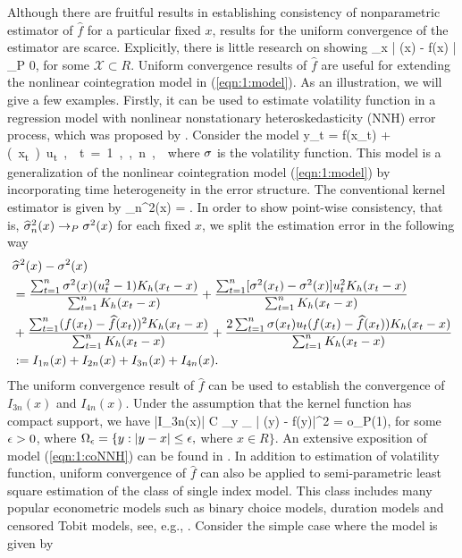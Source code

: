 Although there are fruitful results in establishing consistency of nonparametric estimator of $\widehat{f}$ for a particular fixed $x$, results for the uniform convergence of the estimator are scarce. Explicitly, there is little research on showing
\bestar
\sup_{x \in {}} | (x) - f(x) | \to_P 0,
\eestar
for some $\mathcal{X} \subset R$. Uniform convergence results of $\widehat{f}$ are useful for extending the nonlinear cointegration model in (\ref{eqn:1:model}). As an illustration, we will give a few examples. Firstly, it can be used to estimate volatility function in a regression model with nonlinear nonstationary heteroskedasticity (NNH) error process, which was proposed  by \cite{park2002}. Consider the model
\be {}
y_t = f(x_t) + \si(x_t) u_t, \quad t = 1, ..., n,
\ee
where $\sigma$ is the volatility function. This model is a generalization of the nonlinear cointegration model (\ref{eqn:1:model}) by incorporating time heterogeneity in the error structure. The conventional kernel estimator is given by
\bestar
\widehat{\si}_n^2(x) = .
\eestar
In order to show point-wise consistency, that is, $\widehat{\sigma}^2_n(x) \to_P \sigma^2(x)$ for each fixed $x$, we split the estimation error in the following way
\begin{align}
&\widehat{\sigma}^2(x) - \sigma^2(x) \nonumber\\
&=\frac{\sum_{t = 1}^n \sigma^2(x) (u_t^2 - 1) K_h(x_t - x)}{\sum_{t = 1}^n K_h(x_t - x)} + \frac{\sum_{t = 1}^n [\sigma^2(x_t) - \sigma^2(x) ] u_t^2 K_h(x_t - x)}{\sum_{t = 1}^n K_h(x_t - x)} \nonumber\\
&+\frac{\sum_{t = 1}^n (f(x_t) - \widehat{f}(x_t))^2 K_h(x_t - x)}{\sum_{t = 1}^n K_h(x_t - x)} + \frac{2\sum_{t = 1}^n \sigma(x_t) u_t (f(x_t) - \widehat{f}(x_t))  K_h(x_t - x)}{\sum_{t = 1}^n K_h(x_t - x)} \nonumber\\
&:= I_{1n}(x) + I_{2n}(x) + I_{3n}(x) + I_{4n}(x). \nonumber
\end{align}
The uniform convergence result of $\widehat{f}$ can be used to establish the convergence of $I_{3n}(x)$ and $I_{4n}(x)$. Under the assumption that the kernel function has compact support, we have
\bestar
|I_{3n}(x)| \le C  \sup_{y \in \Omega_\ep} | (y) - f(y)|^2 = o_P(1),
\eestar
for some $\epsilon > 0$, where $\Omega_\epsilon = \{y : |y - x | \le \epsilon, $ where $ x \in R\}$. An extensive exposition of model (\ref{eqn:1:coNNH}) can be found in \cite{wangwang2012}. In addition to estimation of volatility function, uniform convergence of $\widehat{f}$ can also be applied to semi-parametric least square estimation of the class of single index model. This class includes many popular econometric models such as binary choice models, duration models and censored Tobit models, see, e.g., \cite{ichimura1993}. Consider the simple case where the model is given by
